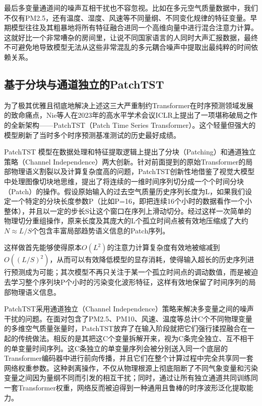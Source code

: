 最后多变量通道间的噪声互相干扰也不容忽视。比如在多元空气质量数据中，我们不仅有PM2.5，还有温度、湿度、风速等不同量纲、不同变化规律的特征变量。早期模型往往及其粗暴地将所有特征融合进同一个高维向量中进行混合注意力计算。这就好比一个非常嘈杂的房间里，让说不同国家语言的人同时大声汇报数据，最终不可避免地导致模型无法从这些非常混乱的多元耦合噪声中提取出最纯粹的时间依赖关系。

\subsection{基于分块与通道独立的PatchTST}

为了极其优雅且彻底地解决上述这三大严重制约Transformer在时序预测领域发展的致命痛点，Nie等人\cite{nie_time_2023}在2023年的高水平学术会议ICLR上提出了一项堪称破局之作的全新架构——PatchTST（Patch Time Series Transformer）。这个轻量但强大的模型刷新了当时多个时序预测基准测试的历史最好成绩。

PatchTST 模型在数据处理和特征提取逻辑上提出了分块（Patching）和通道独立策略（Channel Independence）两大创新。针对前面提到的原始Transformer的局部物理语义割裂以及计算复杂度高的问题，PatchTST创新性地借鉴了视觉大模型中处理图像切块地思维，提出了将连续的一维时间序列切分成一个个时间分块（Patch）的操作。假设原始输入的过去空气质量历史序列长度为L，如果我们设定一个特定的分块长度参数P（比如P=16，即把连续16个小时的数据看作一个小整体），并且以一定的步长S让这个窗口在序列上滑动切分。经过这样一次简单的物理切分重组操作，原来长度及其庞大的L个孤立时间点被有效地压缩成了大约$N \approx L/S$个包含丰富局部趋势语义信息的Patch序列。

这样做首先能够使得原本$O(L^2)$的注意力计算复杂度有效地被缩减到$O((L/S)^2)$，从而可以有效降低模型的显存消耗，使得输入超长的历史序列进行预测成为可能；其次模型不再只关注于某一个孤立时间点的调动数值，而是被迫去学习整个序列块P个小时的污染变化波形特征，这样有效地保留了时间序列的局部物理语义信息。

PatchTST采用通道独立（Channel Independence）策略来解决多变量之间的噪声干扰的问题。在面对包含了PM2.5、PM10、风速、温度等总计C个不同物理变量的多维空气质量张量时，PatchTST放弃了在输入阶段就把它们强行揉捏融合在一起的传统做法。相反的是其把这C个变量拆解开来，视为C条完全独立、互不相干的单变量时间序列。这C条独立的单变量序列会被分别送入同一个底层的Transformer编码器中进行前向传播，并且它们在整个计算过程中完全共享同一套网络权重参数。这种剥离操作，不仅从物理根源上彻底阻断了不同气象变量和污染变量之间因为量纲不同而引发的相互干扰；同时，通过让所有独立通道共同训练同一套Transformer权重，网络反而被迫得到一种通用且鲁棒的时序波形泛化提取能力。

